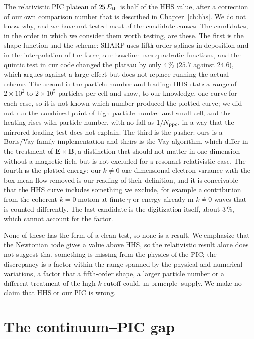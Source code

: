 The relativistic PIC plateau of $25\,E_{\rm th}$ is half of the HHS value, after a correction of our own comparison number that is described in Chapter~\ref{ch:hhs}. We do not know why, and we have not tested most of the candidate causes. The candidates, in the order in which we consider them worth testing, are these. The first is the shape function and the scheme: SHARP uses fifth-order splines in deposition and in the interpolation of the force, our baseline uses quadratic functions, and the quintic test in our code changed the plateau by only $4\,\%$ ($25.7$ against $24.6$), which argues against a large effect but does not replace running the actual scheme. The second is the particle number and loading: HHS state a range of $2\times10^{2}$ to $2\times10^{5}$ particles per cell and show, to our knowledge, one curve for each case, so it is not known which number produced the plotted curve; we did not run the combined point of high particle number and small cell, and the heating rises with particle number, with no fall as $1/N_{\rm ppc}$, in a way that the mirrored-loading test does not explain. The third is the pusher: ours is a Boris/Vay-family implementation and theirs is the Vay algorithm, which differ in the treatment of $\mathbf E\times\mathbf B$, a distinction that should not matter in one dimension without a magnetic field but is not excluded for a resonant relativistic case. The fourth is the plotted energy: our $k\ne0$ one-dimensional electron variance with the box-mean flow removed is our reading of their definition, and it is conceivable that the HHS curve includes something we exclude, for example a contribution from the coherent $k=0$ motion at finite $\gamma$ or energy already in $k\ne0$ waves that is counted differently. The last candidate is the digitization itself, about $3\,\%$, which cannot account for the factor.

None of these has the form of a clean test, so none is a result. We emphasize that the Newtonian code gives a value above HHS, so the relativistic result alone does not suggest that something is missing from the physics of the PIC; the discrepancy is a factor within the range spanned by the physical and numerical variations, a factor that a fifth-order shape, a larger particle number or a different treatment of the high-$k$ cutoff could, in principle, supply. We make no claim that HHS or our PIC is wrong.

\section{The continuum--PIC gap}\label{sec:c10-gap}


